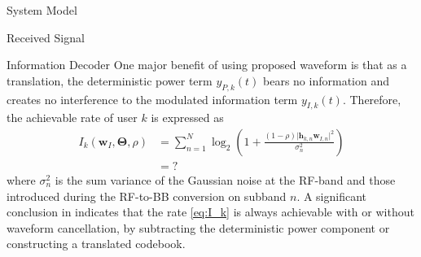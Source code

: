 \documentclass{IEEEtran}
\begin{document}
\begin{section} {System Model}
\begin{subsection}	{Received Signal}
	\end{subsection}

	\begin{subsection}	{Information Decoder}
		One major benefit of using proposed waveform is that as a translation, the deterministic power term $y_{P,k}(t)$ bears no information and creates no interference to the modulated information term $y_{I,k}(t)$. Therefore, the achievable rate of user $k$ is expressed as
		\begin{equation}	\label{eq:I_k}
			\begin{split}
				I_k(\boldsymbol{w}_I,\boldsymbol{\Theta},\rho)
				&=\sum_{n=1}^N{\log_2\left(1+\frac{(1-\rho)\lvert\boldsymbol{h}_{k,n}\boldsymbol{w}_{I,n}\rvert^2}{\sigma_n^2}\right)}	\\
				&=?
			\end{split}
		\end{equation}
		where $\sigma_n^2$ is the sum variance of the Gaussian noise at the RF-band and those introduced during the RF-to-BB conversion on subband $n$. A significant conclusion in \cite{Clerckx2018b} indicates that the rate \ref{eq:I_k} is always achievable with or without waveform cancellation, by subtracting the deterministic power component or constructing a translated codebook.
	\end{subsection}


\end{section}
\end{document}
